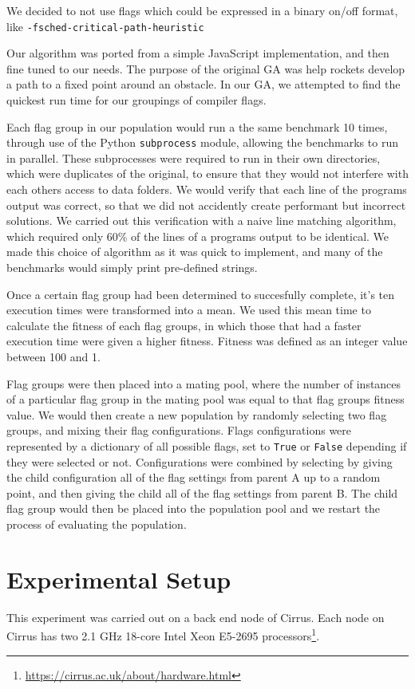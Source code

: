 \documentclass[conference]{IEEEtran}
\begin{document}
We decided to not use flags which could be expressed in a binary on/off format, like \texttt{-fsched-critical-path-heuristic}

Our algorithm was ported from a simple JavaScript implementation\cite{Shiffman16}, and then fine tuned to our needs. The purpose of the original GA was help rockets develop a path to a fixed point around an obstacle. In our GA, we attempted to find the quickest run time for our groupings of compiler flags.

Each flag group in our population would run a the same benchmark 10 times, through use of the Python \texttt{subprocess} module, allowing the benchmarks to run in parallel. These subprocesses were required to run in their own directories, which were duplicates of the original, to ensure that they would not interfere with each others access to data folders. We would verify that each line of the programs output was correct, so that we did not accidently create performant but incorrect solutions. We carried out this verification with a naive line matching algorithm, which required only 60\% of the lines of a programs output to be identical. We made this choice of algorithm as it was quick to implement, and many of the benchmarks would simply print pre-defined strings.

Once a certain flag group had been determined to succesfully complete, it's ten execution times were transformed into a mean.  We used this mean time to calculate the fitness of each flag groups, in which those that had a faster execution time were given a higher fitness. Fitness was defined as an integer value between 100 and 1.

Flag groups were then placed into a mating pool, where the number of instances of a particular flag group in the mating pool was equal to that flag groups fitness value. We would then create a new population by randomly selecting two flag groups, and mixing their flag configurations. Flags configurations were represented by a dictionary of all possible flags, set to \texttt{True} or \texttt{False} depending if they were selected or not. Configurations were combined by selecting by giving the child configuration all of the flag settings from parent A up to a random point, and then giving the child all of the flag settings from parent B. The child flag group would then be placed into the population pool and we restart the process of evaluating the population.


\section{Experimental Setup}
This experiment was carried out on a back end node of Cirrus. Each node on Cirrus has two 2.1 GHz 18-core Intel Xeon E5-2695 processors\footnote{\url{https://cirrus.ac.uk/about/hardware.html}}.
\end{document}
